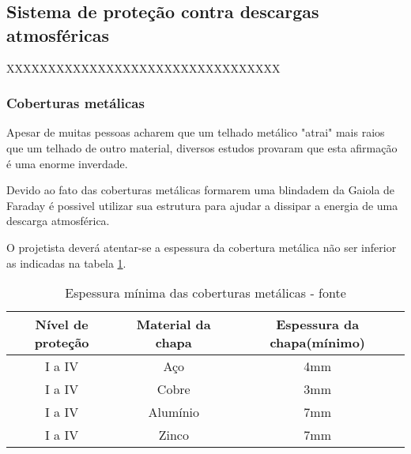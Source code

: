 \subsection{Sistema de proteção contra descargas atmosféricas} \label{subsection: spda}

XXXXXXXXXXXXXXXXXXXXXXXXXXXXXXXXX

\subsubsection{Coberturas metálicas}

Apesar de muitas pessoas acharem que um telhado metálico "atrai" mais raios que um telhado de outro material, diversos estudos provaram que esta afirmação é uma enorme inverdade.

Devido ao fato das coberturas metálicas formarem uma blindadem da Gaiola de Faraday é possivel utilizar sua estrutura para ajudar a dissipar a energia de uma descarga atmosférica.

O projetista deverá atentar-se a espessura da cobertura metálica não ser inferior as indicadas na tabela \ref{table: espessura chapa}.

\begin{table}[ht]
	\centering
	\caption{Espessura mínima das coberturas metálicas - fonte \cite{2015aterramento}}
	\begin{tabular}[t]{ccc}
		\toprule
		\color{Tue-red}\textbf{Nível de proteção}&\color{Tue-red}\textbf{Material da chapa}&\color{Tue-red}\textbf{Espessura da chapa(mínimo)}\\
		\midrule
		I a IV&Aço&4mm\\
		I a IV&Cobre&3mm\\
		I a IV&Alumínio&7mm\\
		I a IV&Zinco&7mm\\
		\bottomrule
	\end{tabular}
	\label{table: espessura chapa}
\end{table}


%

%

%
\newpage
